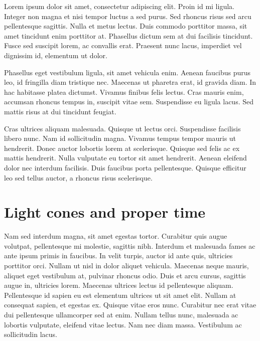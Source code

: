 \documentclass[natbib]{muthesis}
\begin{document}
  Lorem ipsum dolor sit amet, consectetur adipiscing elit. Proin id mi ligula. Integer non magna et nisi tempor luctus a sed purus. Sed rhoncus risus sed arcu pellentesque sagittis. Nulla et metus lectus. Duis commodo porttitor massa, sit amet tincidunt enim porttitor at. Phasellus dictum sem at dui facilisis tincidunt. Fusce sed suscipit lorem, ac convallis erat. Praesent nunc lacus, imperdiet vel dignissim id, elementum ut dolor.

  Phasellus eget vestibulum ligula, sit amet vehicula enim. Aenean faucibus purus leo, id fringilla diam tristique nec. Maecenas ut pharetra erat, id gravida diam. In hac habitasse platea dictumst. Vivamus finibus felis lectus. Cras mauris enim, accumsan rhoncus tempus in, suscipit vitae sem. Suspendisse eu ligula lacus. Sed mattis risus at dui tincidunt feugiat.

  Cras ultrices aliquam malesuada. Quisque ut lectus orci. Suspendisse facilisis libero nunc. Nam id sollicitudin magna. Vivamus tempus tempor mauris ut hendrerit. Donec auctor lobortis lorem at scelerisque. Quisque sed felis ac ex mattis hendrerit. Nulla vulputate eu tortor sit amet hendrerit. Aenean eleifend dolor nec interdum facilisis. Duis faucibus porta pellentesque. Quisque efficitur leo sed tellus auctor, a rhoncus risus scelerisque.

  \section{Light cones and proper time}
  Nam sed interdum magna, sit amet egestas tortor. Curabitur quis augue volutpat, pellentesque mi molestie, sagittis nibh. Interdum et malesuada fames ac ante ipsum primis in faucibus. In velit turpis, auctor id ante quis, ultricies porttitor orci. Nullam ut nisl in dolor aliquet vehicula. Maecenas neque mauris, aliquet eget vestibulum at, pulvinar rhoncus odio. Duis et arcu cursus, sagittis augue in, ultricies lorem. Maecenas ultrices lectus id pellentesque aliquam. Pellentesque id sapien eu est elementum ultrices ut sit amet elit. Nullam at consequat sapien, et egestas ex. Quisque vitae eros nunc. Curabitur nec erat vitae dui pellentesque ullamcorper sed at enim. Nullam tellus nunc, malesuada ac lobortis vulputate, eleifend vitae lectus. Nam nec diam massa. Vestibulum ac sollicitudin lacus.
\end{document}
